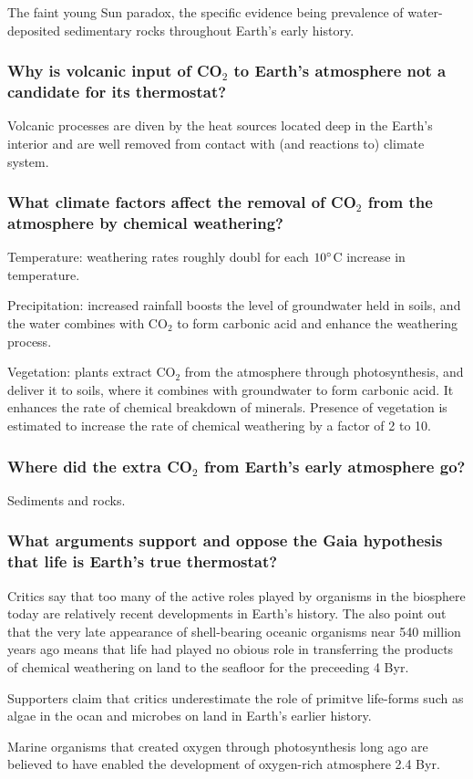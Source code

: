 The faint young Sun paradox, the specific evidence being prevalence of
water-deposited sedimentary rocks throughout Earth's early history.

\subsubsection{Why is volcanic input of CO$_2$ to Earth's atmosphere not a
candidate for its thermostat?}
Volcanic processes are diven by the heat sources located deep in the Earth's
interior and are well removed from contact with (and reactions to) climate
system.

\subsubsection{What climate factors affect the removal of CO$_2$ from the
atmosphere by chemical weathering?}
Temperature: weathering rates roughly doubl for each $10 \degree$C increase
in temperature.

Precipitation: increased rainfall boosts the level of groundwater held in
soils, and the water combines with CO$_2$ to form carbonic acid and enhance
the weathering process.

Vegetation: plants extract CO$_2$ from the atmosphere through photosynthesis,
and deliver it to soils, where it combines with groundwater to form carbonic
acid. It enhances the rate of chemical breakdown of minerals. Presence of
vegetation is estimated to increase the rate of chemical weathering by a factor
of 2 to 10.

\subsubsection{Where did the extra CO$_2$ from Earth's early atmosphere go?}
Sediments and rocks.

\subsubsection{What arguments support and oppose the Gaia hypothesis that
life is Earth's true thermostat?}
Critics say that too many of the active roles played by organisms in the
biosphere today are relatively recent developments in Earth's history. The also
point out that the very late appearance of shell-bearing oceanic organisms
near 540 million years ago means that life had played no obious role in
transferring the products of chemical weathering on land to the seafloor for
the preceeding 4 Byr.

Supporters claim that critics underestimate the role of primitve life-forms
such as algae in the ocan and microbes on land in Earth's earlier history.

Marine organisms that created oxygen through photosynthesis long ago are
believed to have enabled the development of oxygen-rich atmosphere 2.4 Byr.

